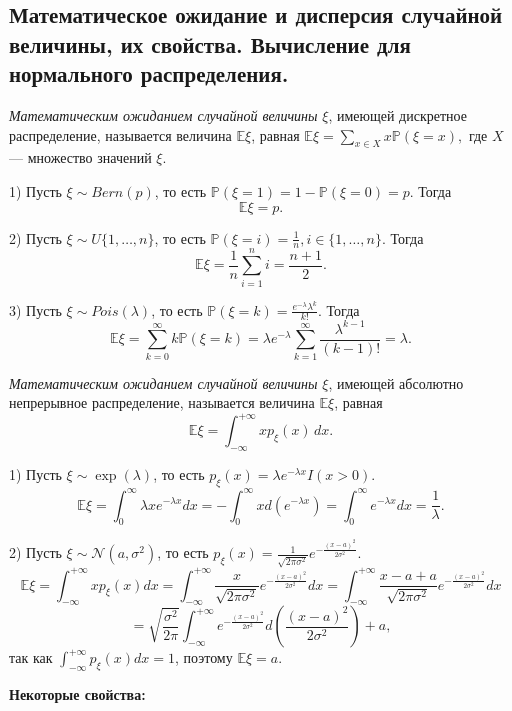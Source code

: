 \subsection{Математическое ожидание и дисперсия случайной величины, их свойства. Вычисление для нормального распределения.}

\Def
\textit{Математическим ожиданием случайной величины} $\xi$, имеющей дискретное распределение, называется величина $\mathbb{E}\xi$, равная
$
\mathbb{E}\xi = \sum_{x \in X} x\mathbb{P}(\xi = x),
$
где $X$ — множество значений $\xi$.

\Example

1) Пусть $\xi \sim Bern(p)$, то есть $\mathbb{P}(\xi=1) = 1-\mathbb{P}(\xi=0) = p$. Тогда
\[
\mathbb{E}\xi = p.
\]

2) Пусть $\xi \sim U\{1, \ldots, n\}$, то есть $\mathbb{P}(\xi=i) = \frac{1}{n}, i \in \{1, \ldots, n\}$. Тогда
\[
\mathbb{E}\xi = \frac{1}{n} \sum_{i=1}^n i = \frac{n+1}{2}.
\]

3) Пусть $\xi \sim Pois(\lambda)$, то есть $\mathbb{P}(\xi = k) = \frac{e^{-\lambda}\lambda^k}{k!}$. Тогда
\[
\mathbb{E}\xi = \sum_{k=0}^{\infty} k \mathbb{P}(\xi = k)
= \lambda e^{-\lambda} \sum_{k=1}^{\infty} \frac{\lambda^{k-1}}{(k-1)!}
= \lambda.
\]


\Def
\textit{Математическим ожиданием случайной величины} $\xi$, имеющей абсолютно непрерывное распределение, называется величина $\mathbb{E}\xi$, равная
\[
\mathbb{E}\xi = \int_{-\infty}^{+\infty} x p_\xi(x)\, dx.
\]

\Example

1) Пусть $\xi \sim \exp(\lambda)$, то есть $p_\xi(x) = \lambda e^{-\lambda x} I(x > 0)$.
\[
\mathbb{E}\xi = \int_0^{\infty} \lambda x e^{-\lambda x} dx = -\int_0^{\infty} x d(e^{-\lambda x}) = \int_0^{\infty} e^{-\lambda x} dx = \frac{1}{\lambda}.
\]

2) Пусть $\xi \sim \mathcal{N}(a, \sigma^2)$, то есть $p_\xi(x) = \frac{1}{\sqrt{2\pi\sigma^2}} e^{-\frac{(x-a)^2}{2\sigma^2}}$.
\[
\mathbb{E}\xi = \int_{-\infty}^{+\infty} x p_\xi(x) dx
= \int_{-\infty}^{+\infty} \frac{x}{\sqrt{2\pi\sigma^2}} e^{-\frac{(x-a)^2}{2\sigma^2}} dx
= \int_{-\infty}^{+\infty} \frac{x-a+a}{\sqrt{2\pi\sigma^2}} e^{-\frac{(x-a)^2}{2\sigma^2}} dx
\]
\[
= \sqrt{\frac{\sigma^2}{2\pi}} \int_{-\infty}^{+\infty} e^{-\frac{(x-a)^2}{2\sigma^2}} d\left( \frac{(x-a)^2}{2\sigma^2} \right) + a,
\]
так как $\int_{-\infty}^{+\infty} p_\xi(x) dx = 1$, поэтому $\mathbb{E}\xi = a$.

\textbf{Некоторые свойства:}

